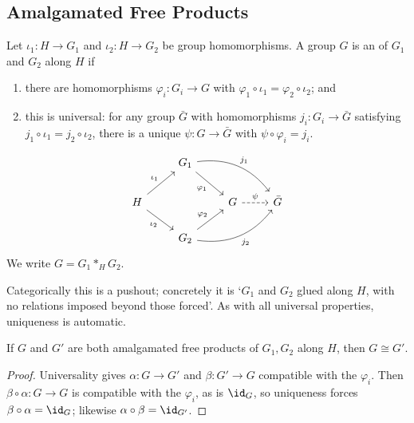 \subsection{Amalgamated Free Products}

\begin{definition}
	Let $\iota_1: H \to G_1$ and $\iota_2: H \to G_2$ be group homomorphisms. A group $G$ is an  of $G_1$ and $G_2$ along $H$ if
	\begin{enumerate}
		\item there are homomorphisms $\varphi_i: G_i \to G$ with $\varphi_1 \circ \iota_1 = \varphi_2 \circ \iota_2$; and
		\item this is universal: for any group $\bar G$ with homomorphisms $j_i: G_i \to \bar G$ satisfying $j_1 \circ\iota_1 = j_2\circ\iota_2$, there is a unique $\psi: G \to \bar G$ with $\psi \circ \varphi_i = j_i$.
	\end{enumerate}
	\[\begin{tikzcd}
		& {G_1} \arrow[rd, "{\varphi_1}"'] \arrow[rrd, "{j_1}", bend left] & & \\
		H \arrow[ru, "{\iota_1}"] \arrow[rd, "{\iota_2}"'] & & G \arrow[r, "\psi", dashed] & {\bar G} \\
		& {G_2} \arrow[ru, "{\varphi_2}"] \arrow[rru, "{j_2}"', bend right] & &
	\end{tikzcd}\]
	We write $G = G_1 *_H G_2$.
\end{definition}

Categorically this is a pushout; concretely it is `$G_1$ and $G_2$ glued along $H$, with
no relations imposed beyond those forced'. As with all universal properties, uniqueness
is automatic.

\begin{proposition}
	If $G$ and $G'$ are both amalgamated free products of $G_1, G_2$ along $H$, then $G \cong G'$.
\end{proposition}
\begin{proof}
	Universality gives $\alpha: G \to G'$ and $\beta: G' \to G$ compatible with the $\varphi_i$. Then $\beta\circ\alpha: G \to G$ is compatible with the $\varphi_i$, as is $\id_G$, so uniqueness forces $\beta\circ\alpha = \id_G$; likewise $\alpha\circ\beta = \id_{G'}$.
\end{proof}

